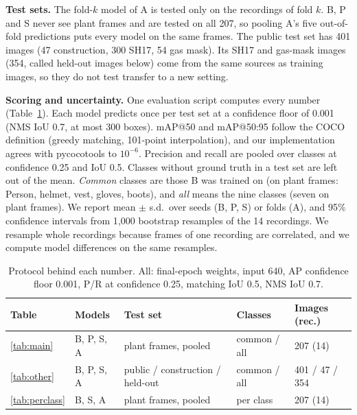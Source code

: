 \textbf{Test sets.} The fold-$k$ model of A is tested only on the recordings of fold $k$. B, P and S never see plant frames and are tested on all 207, so pooling A's five out-of-fold predictions puts every model on the same frames. The public test set has 401 images (47 construction, 300 SH17, 54 gas mask). Its SH17 and gas-mask images (354, called held-out images below) come from the same sources as training images, so they do not test transfer to a new setting.

\textbf{Scoring and uncertainty.} One evaluation script computes every number (Table~\ref{tab:protocol}). Each model predicts once per test set at a confidence floor of 0.001 (NMS IoU 0.7, at most 300 boxes). mAP@50 and mAP@50:95 follow the COCO definition (greedy matching, 101-point interpolation), and our implementation agrees with pycocotools to $10^{-6}$. Precision and recall are pooled over classes at confidence 0.25 and IoU 0.5. Classes without ground truth in a test set are left out of the mean. \emph{Common} classes are those B was trained on (on plant frames: Person, helmet, vest, gloves, boots), and \emph{all} means the nine classes (seven on plant frames). We report mean $\pm$ s.d.\ over seeds (B, P, S) or folds (A), and 95\% confidence intervals from 1{,}000 bootstrap resamples of the 14 recordings. We resample whole recordings because frames of one recording are correlated, and we compute model differences on the same resamples.

\begin{table}[H]
\caption{Protocol behind each number. All: final-epoch weights, input 640, AP confidence floor 0.001, P/R at confidence 0.25, matching IoU 0.5, NMS IoU 0.7.}
\label{tab:protocol}
\centering
\scriptsize
\setlength{\tabcolsep}{4pt}
\begin{tabular}{lllll}
\toprule
Table & Models & Test set & Classes & Images (rec.) \\
\midrule
\ref{tab:main} & B, P, S, A & plant frames, pooled & common / all & 207 (14) \\
\ref{tab:other} & B, P, S, A & public / construction / held-out & common / all & 401 / 47 / 354 \\
\ref{tab:perclass} & B, S, A & plant frames, pooled & per class & 207 (14) \\
\bottomrule
\end{tabular}
\end{table}

